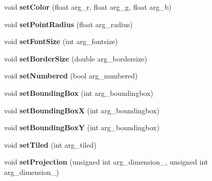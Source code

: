 \begin{DoxyCompactItemize}
\item 
\hypertarget{classutk_1_1PointsetIllustrator__Model_a3ef7b6089e9f4c576b919e52f2bde305}{void {\bfseries set\-Color} (float arg\-\_\-r, float arg\-\_\-g, float arg\-\_\-b)}\label{classutk_1_1PointsetIllustrator__Model_a3ef7b6089e9f4c576b919e52f2bde305}

\item 
\hypertarget{classutk_1_1PointsetIllustrator__Model_aa4d069a0296480bb1ce1f67bfbf810ee}{void {\bfseries set\-Point\-Radius} (float arg\-\_\-radius)}\label{classutk_1_1PointsetIllustrator__Model_aa4d069a0296480bb1ce1f67bfbf810ee}

\item 
\hypertarget{classutk_1_1PointsetIllustrator__Model_aa9ba4f91fb15ea61e83f1140a6e115b2}{void {\bfseries set\-Font\-Size} (int arg\-\_\-fontsize)}\label{classutk_1_1PointsetIllustrator__Model_aa9ba4f91fb15ea61e83f1140a6e115b2}

\item 
\hypertarget{classutk_1_1PointsetIllustrator__Model_aa7513c277cd78b3a47ee51874a8fec57}{void {\bfseries set\-Border\-Size} (double arg\-\_\-bordersize)}\label{classutk_1_1PointsetIllustrator__Model_aa7513c277cd78b3a47ee51874a8fec57}

\item 
\hypertarget{classutk_1_1PointsetIllustrator__Model_aaf0b3e4b235ada83d36980a836c48d02}{void {\bfseries set\-Numbered} (bool arg\-\_\-numbered)}\label{classutk_1_1PointsetIllustrator__Model_aaf0b3e4b235ada83d36980a836c48d02}

\item 
\hypertarget{classutk_1_1PointsetIllustrator__Model_a3f800307a9838cc8d7948d309fab90ed}{void {\bfseries set\-Bounding\-Box} (int arg\-\_\-boundingbox)}\label{classutk_1_1PointsetIllustrator__Model_a3f800307a9838cc8d7948d309fab90ed}

\item 
\hypertarget{classutk_1_1PointsetIllustrator__Model_a8f170fd8459edcbd7aee9578db9c6493}{void {\bfseries set\-Bounding\-Box\-X} (int arg\-\_\-boundingbox)}\label{classutk_1_1PointsetIllustrator__Model_a8f170fd8459edcbd7aee9578db9c6493}

\item 
\hypertarget{classutk_1_1PointsetIllustrator__Model_ab9919fb17f2cd97659c4cd8897bdab6b}{void {\bfseries set\-Bounding\-Box\-Y} (int arg\-\_\-boundingbox)}\label{classutk_1_1PointsetIllustrator__Model_ab9919fb17f2cd97659c4cd8897bdab6b}

\item 
\hypertarget{classutk_1_1PointsetIllustrator__Model_a445e15205f7d4cbddef10f96b37986ed}{void {\bfseries set\-Tiled} (int arg\-\_\-tiled)}\label{classutk_1_1PointsetIllustrator__Model_a445e15205f7d4cbddef10f96b37986ed}

\item 
\hypertarget{classutk_1_1PointsetIllustrator__Model_ae053fc5284fb201bd2febbb04867e894}{void {\bfseries set\-Projection} (unsigned int arg\-\_\-dimension\-\_, unsigned int arg\-\_\-dimension\-\_)}\label{classutk_1_1PointsetIllustrator__Model_ae053fc5284fb201bd2febbb04867e894}

\end{DoxyCompactItemize}
